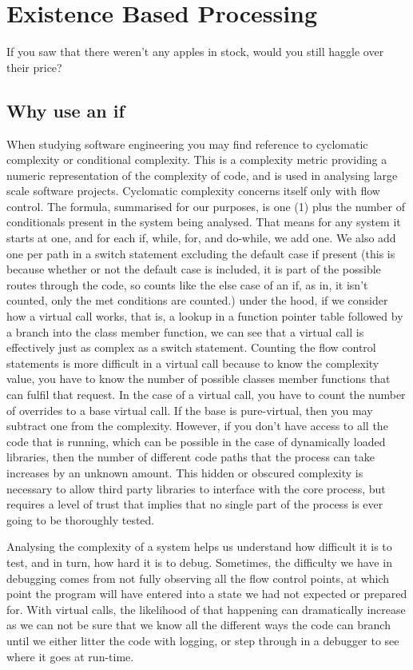 \chapter{Existence Based Processing}

If you saw that there weren't any apples in stock, would you still haggle over
their price?

\section{Why use an if}\label{sec:exist-whyif}

When studying software engineering you may find reference to cyclomatic
complexity or conditional complexity. This is a complexity metric providing a
numeric representation of the complexity of code, and is used in analysing
large scale software projects. Cyclomatic complexity concerns itself only with
flow control. The formula, summarised for our purposes, is one (1) plus the
number of conditionals present in the system being analysed. That means for any
system it starts at one, and for each if, while, for, and do-while, we add one.
We also add one per path in a switch statement excluding the default case if
present (this is because whether or not the default case is included, it is
part of the possible routes through the code, so counts like the else case of
an if, as in, it isn't counted, only the met conditions are counted.) under the
hood, if we consider how a virtual call works, that is, a lookup in a function
pointer table followed by a branch into the class member function, we can see
that a virtual call is effectively just as complex as a switch statement.
Counting the flow control statements is more difficult in a virtual call
because to know the complexity value, you have to know the number of possible
classes member functions that can fulfil that request. In the case of a virtual
call, you have to count the number of overrides to a base virtual call. If the
base is pure-virtual, then you may subtract one from the complexity. However,
if you don't have access to all the code that is running, which can be possible
in the case of dynamically loaded libraries, then the number of different code
paths that the process can take increases by an unknown amount. This hidden or
obscured complexity is necessary to allow third party libraries to interface
with the core process, but requires a level of trust that implies that no
single part of the process is ever going to be thoroughly tested.

Analysing the complexity of a system helps us understand how difficult it is to
test, and in turn, how hard it is to debug. Sometimes, the difficulty we have
in debugging comes from not fully observing all the flow control points, at
which point the program will have entered into a state we had not expected or
prepared for. With virtual calls, the likelihood of that happening can
dramatically increase as we can not be sure that we know all the different ways
the code can branch until we either litter the code with logging, or step
through in a debugger to see where it goes at run-time.

